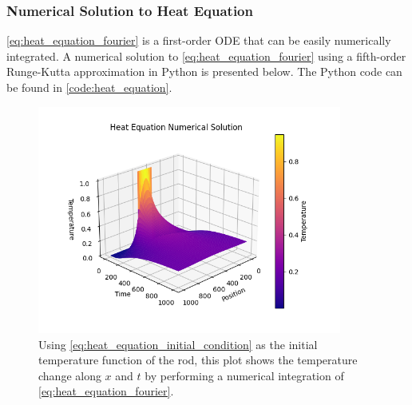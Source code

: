 \subsubsection{Numerical Solution to Heat Equation}
\cref{eq:heat_equation_fourier} is a first-order ODE that can be easily numerically integrated. A numerical solution to \cref{eq:heat_equation_fourier} using a fifth-order Runge-Kutta approximation in Python is presented below. The Python code can be found in \cref{code:heat_equation}.

\begin{figure}[H]
    \centering
    \includegraphics[width=100mm,height=\textheight,keepaspectratio]{images/heat_equation_numerical.png}
    \caption{Using \cref{eq:heat_equation_initial_condition} as the initial temperature function of the rod, this plot shows the temperature change along \(x\) and \(t\) by performing a numerical integration of \cref{eq:heat_equation_fourier}.}
    \label{fig:heat_equation_numerical}
\end{figure}